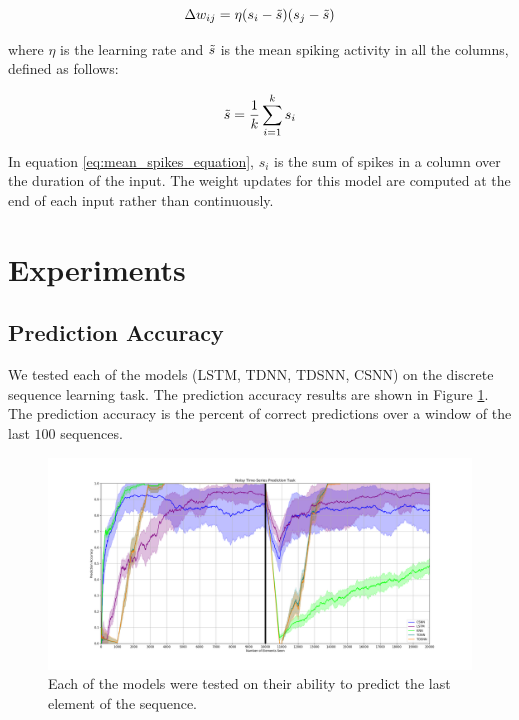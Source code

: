 \documentclass{article}
\begin{document}
\begin{equation}
    \Delta w_{ij} = \eta(s_{i} - \Tilde{s})(s_{j} -  \Tilde{s})
\end{equation}

where $\eta$ is the learning rate and $\Tilde{s}$ is the mean spiking activity in all the columns, defined as follows:

\begin{equation}
    \Tilde{s} = \frac{1}{k} \sum_{i = 1}^{k}{s_i}
    \label{eq:mean_spikes_equation}
\end{equation}

In equation \ref{eq:mean_spikes_equation}, $s_i$ is the sum of spikes in a column over the duration of the input. The weight updates for this model are computed at the end of each input rather than continuously.



\section*{Experiments}

\subsection*{Prediction Accuracy}

We tested each of the models (LSTM, TDNN, TDSNN, CSNN) on the discrete sequence learning task. The prediction accuracy results are shown in Figure \ref{fig:prediction-accuracy}. The prediction accuracy is the percent of correct predictions over a window of the last $100$ sequences.

\begin{figure}[!h]
    \centering
    \includegraphics[width=0.9\linewidth]{../results/artificial.png}
    \caption{Each of the models were tested on their ability to predict the last element of the sequence.}
    \label{fig:prediction-accuracy}
\end{figure}
\end{document}
